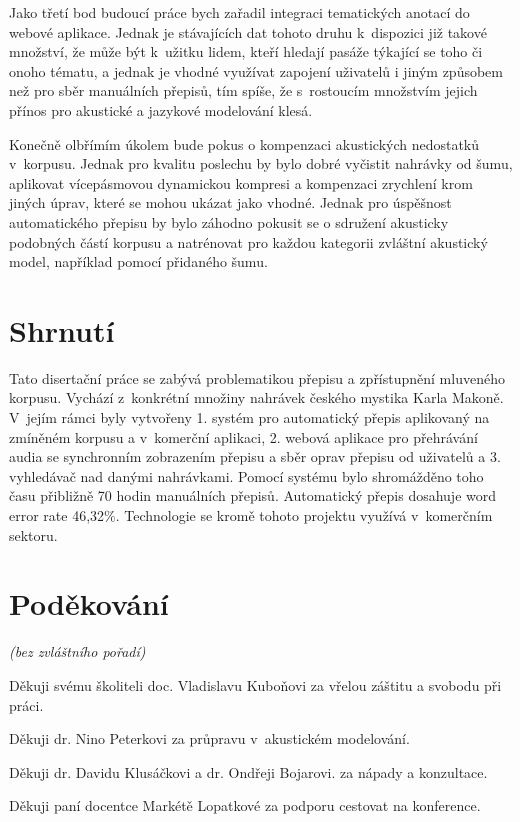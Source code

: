 Jako třetí bod budoucí práce bych zařadil integraci tematických anotací do
webové aplikace. Jednak je stávajících dat tohoto druhu k~dispozici již takové
množství, že může být k~užitku lidem, kteří hledají pasáže týkající se toho či
onoho tématu, a jednak je vhodné využívat zapojení uživatelů i jiným způsobem
než pro sběr manuálních přepisů, tím spíše, že s~rostoucím množstvím jejich
přínos pro akustické a jazykové modelování klesá.

Konečně olbřímím úkolem bude pokus o kompenzaci akustických nedostatků
v~korpusu. Jednak pro kvalitu poslechu by bylo dobré vyčistit nahrávky od šumu,
aplikovat vícepásmovou dynamickou kompresi a kompenzaci zrychlení krom jiných
úprav, které se mohou ukázat jako vhodné. Jednak pro úspěšnost automatického
přepisu by bylo záhodno pokusit se o sdružení akusticky podobných částí korpusu
a natrénovat pro každou kategorii zvláštní akustický model, například pomocí
přidaného šumu.\cite{zur2009noise}\cite{VARGA1993247}

\section{Shrnutí}

Tato disertační práce se zabývá problematikou přepisu a zpřístupnění mluveného
korpusu. Vychází z~konkrétní množiny nahrávek českého mystika Karla Makoně.
V~jejím rámci byly vytvořeny 1. systém pro automatický přepis aplikovaný na zmíněném
korpusu a v~komerční aplikaci, 2. webová aplikace pro přehrávání audia se
synchronním zobrazením přepisu a sběr oprav přepisu od uživatelů a 3.
vyhledávač nad danými nahrávkami. Pomocí systému bylo shromážděno toho času
přibližně 70 hodin manuálních přepisů. Automatický přepis dosahuje word error
rate 46,32\%. Technologie se kromě tohoto projektu využívá v~komerčním sektoru.

\section{Poděkování}

{\em (bez zvláštního pořadí)}

Děkuji svému školiteli doc. Vladislavu Kuboňovi za vřelou záštitu a svobodu při
práci.

Děkuji dr. Nino Peterkovi za průpravu v~akustickém modelování.

Děkuji dr. Davidu Klusáčkovi a dr. Ondřeji Bojarovi. za nápady a konzultace.

Děkuji paní docentce Markétě Lopatkové za podporu cestovat na konference.

